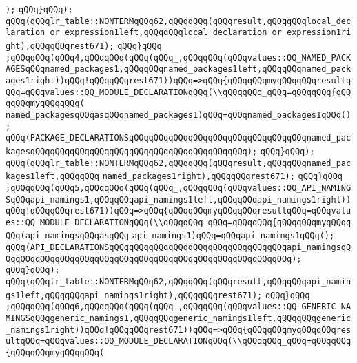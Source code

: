 \verb|);|\newline
\verb|qQQq}qQQq);|\newline
\verb|qQQq(qQQqlr_table::NONTERMqQQq62,qQQqqQQq(qQQqresult,qQQqqQQqlocal_declaration_or_expression1left,qQQqqQQqlocal_declaration_or_expression1right),qQQqqQQqrest671);|\newline
\verb|qQQq}qQQq|\newline
\verb|;qQQqqQQq(qQQq4,qQQqqQQq(qQQq(qQQq_,qQQqqQQq(qQQqvalues::QQ_NAMED_PACKAGESqQQqnamed_packages1,qQQqqQQqnamed_packages1left,qQQqqQQqnamed_packages1right))qQQq!qQQqqQQqrest671))qQQq=>qQQq{qQQqqQQqmyqQQqqQQqresultqQQq=qQQqvalues::QQ_MODULE_DECLARATIONqQQq(\\qQQqqQQq_qQQq=qQQqqQQq{qQQqqQQqmyqQQqqQQq(|\newline
\verb|named_packagesqQQqasqQQqnamed_packages1)qQQq=qQQqnamed_packages1qQQq();|\newline
\verb|qQQq(PACKAGE_DECLARATIONSqQQqqQQqqQQqqQQqqQQqqQQqqQQqqQQqqQQqnamed_packagesqQQqqQQqqQQqqQQqqQQqqQQqqQQqqQQqqQQqqQQqqQQq);|\newline
\verb|qQQq}qQQq);|\newline
\verb|qQQq(qQQqlr_table::NONTERMqQQq62,qQQqqQQq(qQQqresult,qQQqqQQqnamed_packages1left,qQQqqQQq|\newline
\verb|named_packages1right),qQQqqQQqrest671);|\newline
\verb|qQQq}qQQq|\newline
\verb|;qQQqqQQq(qQQq5,qQQqqQQq(qQQq(qQQq_,qQQqqQQq(qQQqvalues::QQ_API_NAMINGSqQQqapi_namings1,qQQqqQQqapi_namings1left,qQQqqQQqapi_namings1right))qQQq!qQQqqQQqrest671))qQQq=>qQQq{qQQqqQQqmyqQQqqQQqresultqQQq=qQQqvalues::QQ_MODULE_DECLARATIONqQQq(\\qQQqqQQq_qQQq=qQQqqQQq{qQQqqQQqmyqQQqqQQq(api_namingsqQQqasqQQq|\newline
\verb|api_namings1)qQQq=qQQqapi_namings1qQQq();|\newline
\verb|qQQq(API_DECLARATIONSqQQqqQQqqQQqqQQqqQQqqQQqqQQqqQQqqQQqapi_namingsqQQqqQQqqQQqqQQqqQQqqQQqqQQqqQQqqQQqqQQqqQQqqQQqqQQqqQQqqQQq);|\newline
\verb|qQQq}qQQq);|\newline
\verb|qQQq(qQQqlr_table::NONTERMqQQq62,qQQqqQQq(qQQqresult,qQQqqQQqapi_namings1left,qQQqqQQqapi_namings1right),qQQqqQQqrest671);|\newline
\verb|qQQq}qQQq|\newline
\verb|;qQQqqQQq(qQQq6,qQQqqQQq(qQQq(qQQq_,qQQqqQQq(qQQqvalues::QQ_GENERIC_NAMINGSqQQqgeneric_namings1,qQQqqQQqgeneric_namings1left,qQQqqQQqgeneric_namings1right))qQQq!qQQqqQQqrest671))qQQq=>qQQq{qQQqqQQqmyqQQqqQQqresultqQQq=qQQqvalues::QQ_MODULE_DECLARATIONqQQq(\\qQQqqQQq_qQQq=qQQqqQQq{qQQqqQQqmyqQQqqQQq(|\newline
